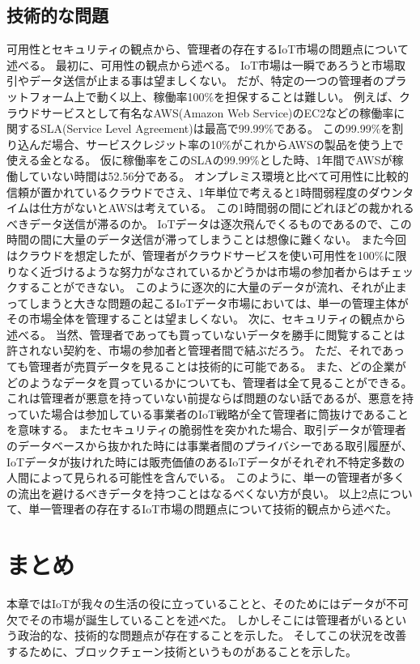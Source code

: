 \subsection{技術的な問題}
可用性とセキュリティの観点から、管理者の存在するIoT市場の問題点について述べる。
最初に、可用性の観点から述べる。
IoT市場は一瞬であろうと市場取引やデータ送信が止まる事は望ましくない。
だが、特定の一つの管理者のプラットフォーム上で動く以上、稼働率100\%を担保することは難しい。
例えば、クラウドサービスとして有名なAWS(Amazon Web Service)のEC2などの稼働率に関するSLA(Service Level Agreement)は最高で99.99\%である。
この99.99\%を割り込んだ場合、サービスクレジット率の10\%がこれからAWSの製品を使う上で使える金となる。
仮に稼働率をこのSLAの99.99\%とした時、1年間でAWSが稼働していない時間は52.56分である。
オンプレミス環境と比べて可用性に比較的信頼が置かれているクラウドでさえ、1年単位で考えると1時間弱程度のダウンタイムは仕方がないとAWSは考えている。
この1時間弱の間にどれほどの裁かれるべきデータ送信が滞るのか。
IoTデータは逐次飛んでくるものであるので、この時間の間に大量のデータ送信が滞ってしまうことは想像に難くない。
また今回はクラウドを想定したが、管理者がクラウドサービスを使い可用性を100\%に限りなく近づけるような努力がなされているかどうかは市場の参加者からはチェックすることができない。
このように逐次的に大量のデータが流れ、それが止まってしまうと大きな問題の起こるIoTデータ市場においては、単一の管理主体がその市場全体を管理することは望ましくない。
次に、セキュリティの観点から述べる。
当然、管理者であっても買っていないデータを勝手に閲覧することは許されない契約を、市場の参加者と管理者間で結ぶだろう。
ただ、それであっても管理者が売買データを見ることは技術的に可能である。
また、どの企業がどのようなデータを買っているかについても、管理者は全て見ることができる。
これは管理者が悪意を持っていない前提ならば問題のない話であるが、悪意を持っていた場合は参加している事業者のIoT戦略が全て管理者に筒抜けであることを意味する。
またセキュリティの脆弱性を突かれた場合、取引データが管理者のデータベースから抜かれた時には事業者間のプライバシーである取引履歴が、IoTデータが抜けれた時には販売価値のあるIoTデータがそれぞれ不特定多数の人間によって見られる可能性を含んでいる。
このように、単一の管理者が多くの流出を避けるべきデータを持つことはなるべくない方が良い。
以上2点について、単一管理者の存在するIoT市場の問題点について技術的観点から述べた。

\section{まとめ}
本章ではIoTが我々の生活の役に立っていることと、そのためにはデータが不可欠でその市場が誕生していることを述べた。
しかしそこには管理者がいるという政治的な、技術的な問題点が存在することを示した。
そしてこの状況を改善するために、ブロックチェーン技術というものがあることを示した。